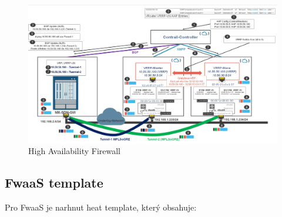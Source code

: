 \begin{figure}[h]
\begin{centering}
\includegraphics[scale=0.11]{images/contrailHA}
\par\end{centering}
\caption{High Availability Firewall\label{fig:contrailHA}}
\end{figure}


\subsection{FwaaS template}

Pro FwaaS je narhnut heat template, který obsahuje:





